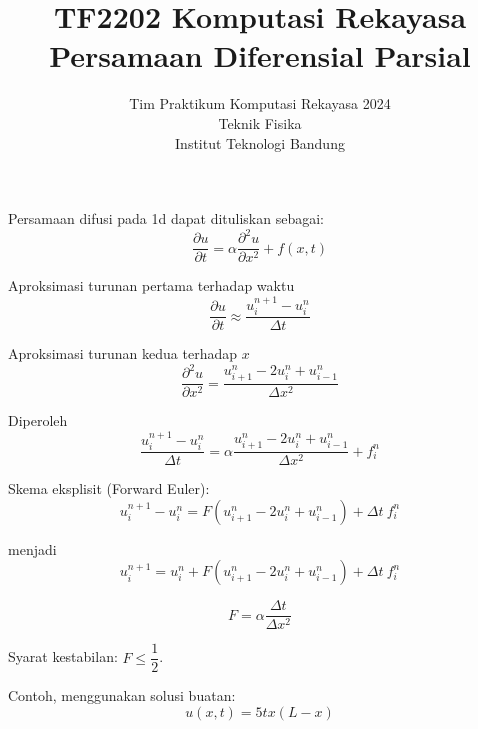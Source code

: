 



\title{%
{\small TF2202 Komputasi Rekayasa}\\
Persamaan Diferensial Parsial
}
\author{Tim Praktikum Komputasi Rekayasa 2024\\
Teknik Fisika\\
Institut Teknologi Bandung}
\date{}
\maketitle

Persamaan difusi pada 1d dapat dituliskan sebagai:
\begin{equation*}
\frac{\partial u}{\partial t} =\alpha\frac{\partial^{2}u}{\partial x^{2}}+f(x,t)
\end{equation*}

Aproksimasi turunan pertama terhadap waktu
\begin{equation*}
\frac{\partial u}{\partial t}\approx\frac{u_{i}^{n+1}-u_{i}^{n}}{\Delta t}    
\end{equation*}

Aproksimasi turunan kedua terhadap $x$
\begin{equation*}
\frac{\partial^{2}u}{\partial x^{2}}=\frac{u_{i+1}^{n}-2u_{i}^{n}+u_{i-1}^{n}}{\Delta x^{2}}
\end{equation*}

Diperoleh
\begin{equation*}
\frac{u_{i}^{n+1}-u_{i}^{n}}{\Delta t}=\alpha\frac{u_{i+1}^{n}-2u_{i}^{n}+u_{i-1}^{n}}{\Delta x^{2}}+f_{i}^{n}
\end{equation*}

Skema eksplisit (Forward Euler):
\begin{equation*}
u_{i}^{n+1}-u_{i}^{n}=F\left(u_{i+1}^{n}-2u_{i}^{n}+u_{i-1}^{n}\right)+\Delta t\ f_{i}^{n}
\end{equation*}


menjadi
\begin{equation*}
u_{i}^{n+1} = u_{i}^{n} + F\left(u_{i+1}^{n} - 2u_{i}^{n} + u_{i-1}^{n}\right)+\Delta t\ f_{i}^{n}
\end{equation*}

\begin{equation*}
F = \alpha\frac{\Delta t}{\Delta x^{2}}
\end{equation*}

Syarat kestabilan: $F\leq\dfrac{1}{2}$.

Contoh, menggunakan solusi buatan:
\begin{equation*}
u(x,t) = 5tx(L-x)    
\end{equation*}

